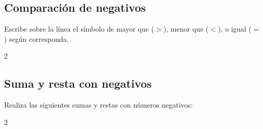 \documentclass[12pt,addpoints]{evalua}
\begin{document}
\begin{questions}
      
	\subsection*{Comparación de negativos}
    
      \question[4] Escribe sobre la línea el símbolo de mayor que ($>$), menor que ($<$), o igual ($=$) según corresponda.

      \begin{multicols}{2}
      \end{multicols}

      
	\subsection*{Suma y resta con negativos}
    
      \question[4] Realiza las siguientes sumas y restas con números negativos:

      \begin{multicols}{2}
\end{multicols}
\end{questions}
\end{document}
